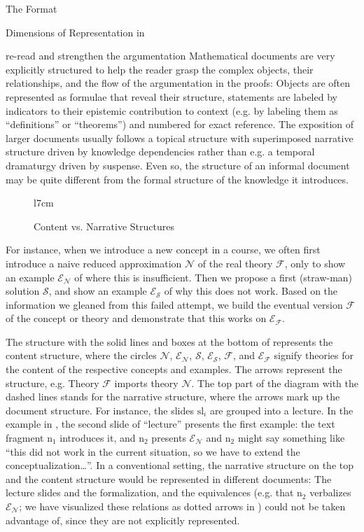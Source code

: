 \begin{omgroup}[creators=miko,id=spec-intro]{The \omdoc Format}
\begin{omgroup}[id=syntax-semantics]{Dimensions of Representation in \omdoc}
\begin{newpart}{re-read and strengthen the argumentation}
Mathematical documents are very explicitly structured to help the reader grasp the complex
objects, their relationships, and the flow of the argumentation in the proofs: Objects are
often represented as formulae that reveal their structure, statements are labeled by
indicators to their epistemic contribution to context (e.g. by labeling them as
``definitions'' or ``theorems'') and numbered for exact reference. The exposition of
larger documents usually follows a topical structure with superimposed narrative structure
driven by knowledge dependencies rather than e.g. a temporal dramaturgy driven by
suspense.  Even so, the structure of an informal document may be quite different from the
formal structure of the knowledge it introduces.

\begin{figure}l{7cm}\vspace*{-2em}
\caption{Content vs. Narrative Structures}\label{fig:straw-man}
\end{figure}
For instance, when we introduce a new concept in a course, we often first introduce a
naive reduced approximation $\mathcal{N}$ of the real theory $\mathcal{F}$, only to show
an example $\mathcal{E_N}$ of where this is insufficient. Then we propose a first
(straw-man) solution $\mathcal{S}$, and show an example $\mathcal{E_S}$ of why this does
not work. Based on the information we gleaned from this failed attempt, we build the
eventual version $\mathcal{F}$ of the concept or theory and demonstrate that this works on
$\mathcal{E_F}$.
 
The structure with the solid lines and boxes at the bottom of {}
represents the content structure, where the circles $\mathcal{N}$, $\mathcal{E_N}$,
$\mathcal{S}$, $\mathcal{E_S}$, $\mathcal{F}$, and $\mathcal{E_F}$ signify theories for
the content of the respective concepts and examples. The arrows represent the
{} structure, e.g. Theory $\mathcal{F}$ imports theory
$\mathcal{N}$. The top part of the diagram with the dashed lines stands for the narrative
structure, where the arrows mark up the document structure. For instance, the slides
$\text{sl}_i$ are grouped into a lecture. In the example in {}, the
second slide of ``lecture'' presents the first example: the text fragment $\text{n}_1$
introduces it, and $\text{n}_2$ presents $\mathcal{E_N}$ and $\text{n}_2$ might say
something like ``this did not work in the current situation, so we have to extend the
conceptualization\ldots''. In a conventional setting, the narrative structure on the top
and the content structure would be represented in different documents: The lecture slides
and the formalization, and the equivalences (e.g. that $\text{n}_2$ verbalizes
$\mathcal{E_N}$; we have visualized these relations as dotted arrows in
{}) could not be taken advantage of, since they are not explicitly
represented.


\end{newpart}
\end{omgroup}
\end{omgroup}
